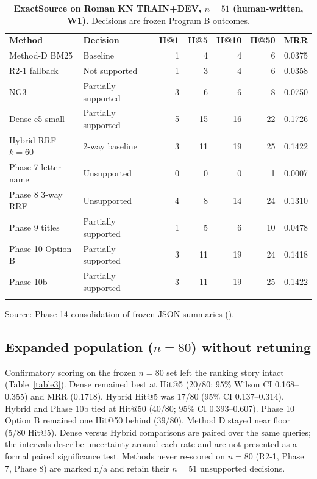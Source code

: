 \documentclass[10pt,letterpaper]{article}
\newlength\savedwidth
\newcommand\thickhline{\noalign{\global\savedwidth\arrayrulewidth\global\arrayrulewidth 2pt}%
\hline
\noalign{\global\arrayrulewidth\savedwidth}}
\begin{document}
\begin{table}[!ht]
\centering
\caption{\textbf{ExactSource on Roman KN TRAIN+DEV, $n = 51$ (human-written, W1).} Decisions are frozen Program B outcomes.}
\label{table2}
\begin{tabular}{llrrrrr}
\thickhline
\textbf{Method} & \textbf{Decision} & \textbf{H@1} & \textbf{H@5} & \textbf{H@10} & \textbf{H@50} & \textbf{MRR} \\
\thickhline
Method-D BM25 & Baseline & 1 & 4 & 4 & 6 & 0.0375 \\
R2-1 fallback & Not supported & 1 & 3 & 4 & 6 & 0.0358 \\
NG3 & Partially supported & 3 & 6 & 6 & 8 & 0.0750 \\
Dense e5-small & Partially supported & 5 & 15 & 16 & 22 & 0.1726 \\
Hybrid RRF $k{=}60$ & 2-way baseline & 3 & 11 & 19 & 25 & 0.1422 \\
Phase 7 letter-name & Unsupported & 0 & 0 & 0 & 1 & 0.0007 \\
Phase 8 3-way RRF & Unsupported & 4 & 8 & 14 & 24 & 0.1310 \\
Phase 9 titles & Partially supported & 1 & 5 & 6 & 10 & 0.0478 \\
Phase 10 Option B & Partially supported & 3 & 11 & 19 & 24 & 0.1418 \\
Phase 10b & Partially supported & 3 & 11 & 19 & 25 & 0.1422 \\
\thickhline
\end{tabular}
\begin{flushleft} Source: Phase 14 consolidation of frozen JSON summaries ().
\end{flushleft}
\end{table}

\subsection*{Expanded population ($n = 80$) without retuning}

Confirmatory scoring on the frozen $n = 80$ set left the ranking story intact (Table~\ref{table3}). Dense remained best at Hit@5 (20/80; 95\% Wilson CI 0.168--0.355) and MRR (0.1718). Hybrid Hit@5 was 17/80 (95\% CI 0.137--0.314). Hybrid and Phase 10b tied at Hit@50 (40/80; 95\% CI 0.393--0.607). Phase 10 Option B remained one Hit@50 behind (39/80). Method D stayed near floor (5/80 Hit@5). Dense versus Hybrid comparisons are paired over the same queries; the intervals describe uncertainty around each rate and are not presented as a formal paired significance test. Methods never re-scored on $n = 80$ (R2-1, Phase 7, Phase 8) are marked n/a and retain their $n = 51$ unsupported decisions.
\end{document}

